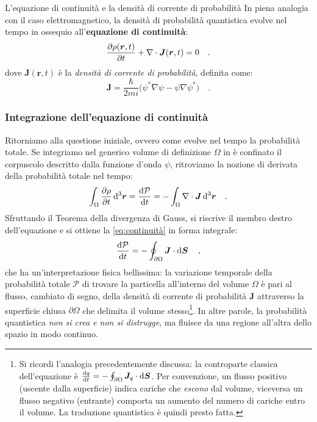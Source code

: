 \begin{concettochiave}{L'equazione di continuità e la densità di corrente di probabilità}
    \noindent
    In piena analogia con il caso elettromagnetico, la densità di probabilità quantistica evolve nel tempo in ossequio all'\textbf{equazione di continuità}:
    \begin{equation}
    \pdv{\rho(\bm{r}, t)}{t} + \nabla \cdot \bm{J}(\bm{r},t) = 0 \quad.
    \label{eq:continuità}
\end{equation}
dove $\bm{J}(\bm{r},t)$ è la \emph{densità di corrente di probabilità}, definita come:
\begin{equation}
    \bm{J} = \frac{\hbar}{2mi}\big( \psi^*\nabla\psi - \psi\nabla\psi^* \big) \quad.
\end{equation}
\end{concettochiave}

\subsubsection{Integrazione dell'equazione di continuità}
Ritorniamo alla questione iniziale, ovvero come evolve nel tempo la probabilità totale. Se integriamo nel generico volume di definizione $\Omega$ in è confinato il corpuscolo descritto dalla funzione d'onda $\psi$, ritroviamo la nozione di derivata della probabilità totale nel tempo:
\[
    \int_\Omega \pdv{\rho}{t} \, \dd^3{\bm{r}} = \dv{\mathcal{P}}{t} = -\int_\Omega \nabla \cdot \bm{J} \, \dd^3{\bm{r}} \quad.
\]
Sfruttando il Teorema della divergenza di Gauss, si riscrive il membro destro dell'equazione e si ottiene la \eqref{eq:continuità} in forma integrale:
\[
    \dv{\mathcal{P}}{t} = -\oint_{\partial \Omega} \bm{J} \cdot \dd{\bm{S}} \quad,
\]
che ha un'interpretazione fisica bellissima: la variazione temporale della probabilità totale $\mathcal{P}$ di trovare la particella all'interno del volume $\Omega$ è pari al flusso, cambiato di segno, della densità di corrente di probabilità $\bm{J}$ attraverso la superficie chiusa $\partial \Omega$ che delimita il volume stesso\footnote{Si ricordi l'analogia precedentemente discussa: la controparte classica dell'equazione è $\dv{q}{t} = -\oint_{\partial \Omega} \bm{J}_q \cdot \dd{\bm{S}}$. Per convenzione, un flusso positivo (uscente dalla superficie) indica cariche che \emph{escono} dal volume, viceversa un flusso negativo (entrante) comporta un aumento del numero di cariche entro il volume. La traduzione quantistica è quindi presto fatta.}. In altre parole, la probabilità quantistica \emph{non si crea e non si distrugge}, ma fluisce da una regione all'altra dello spazio in modo continuo.

